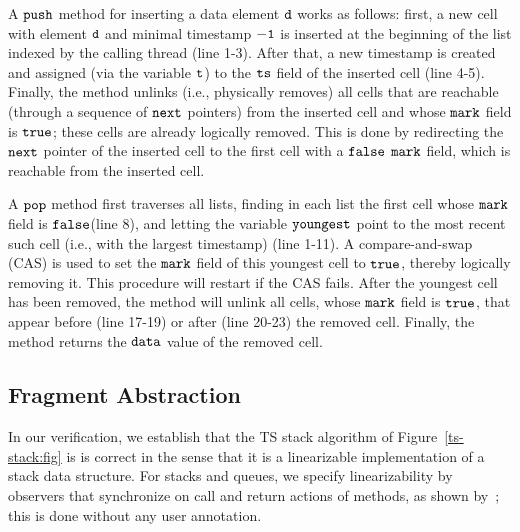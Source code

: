 A ${\tt push}$ method for inserting a data element ${\tt d}$ works as follows: first, a new cell with element ${\tt d}$ and minimal timestamp ${\tt -1}$ is inserted at the beginning of the list indexed by the calling thread (line 1-3). After that, a new timestamp is created and assigned (via the variable ${\tt t}$) to the ${\tt ts}$ field of the inserted cell (line 4-5).
Finally, the method unlinks (i.e., physically removes) all cells that are reachable (through a sequence of $\tt next$ pointers) from the inserted cell and whose ${\tt mark}$ field is ${\tt true}$; these cells are already logically removed. This is done by redirecting the $\tt next$ pointer of the inserted cell to the first cell with a ${\tt false}$ $\tt mark$ field, which is
reachable from the inserted cell.

A ${\tt pop}$ method first traverses all lists, finding in each list
the first cell whose ${\tt mark}$ field is ${\tt false}$(line 8), and letting the variable ${\tt youngest}$ point to the most recent such cell
(i.e., with the largest timestamp) (line 1-11).
A compare-and-swap (CAS) is used
to set the ${\tt mark}$ field of this youngest cell to ${\tt true}$,
thereby logically removing it.
This procedure will restart if the CAS fails. After the youngest cell has been removed, the method will unlink all cells, whose ${\tt mark}$ field is ${\tt true}$,
that appear before (line 17-19) or after (line 20-23) the removed cell.
Finally, the method returns the ${\tt data}$ value of the removed cell.

\subsection{Fragment Abstraction}
In our verification, we establish that the TS stack algorithm of
Figure~\ref{ts-stack:fig} is is correct in the sense that it is a
linearizable implementation of a stack data structure.
For stacks and queues, we specify linearizability by 
 observers that synchronize on call and return actions of
  methods, as shown by~\cite{BEEH:icalp15}; this is done without
 any user annotation.

